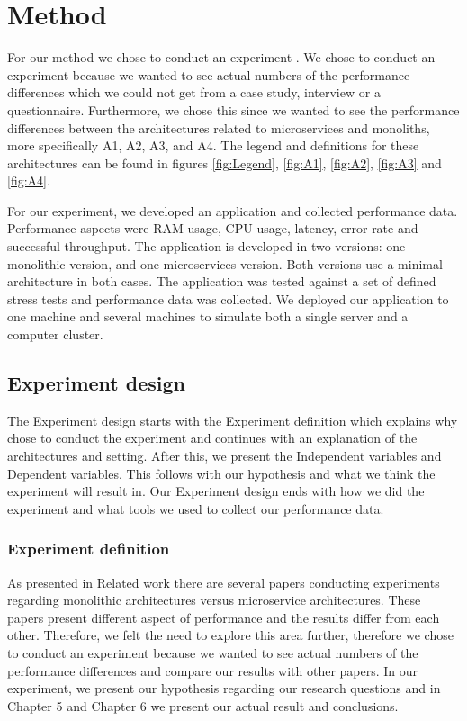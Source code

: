 \documentclass[a4paper,oneside]{bth}
\begin{document}
\chapter{Method} \label{Method}

For our method we chose to conduct an experiment \cite{Juristo:2010:BSE:1965114}. We chose to conduct an experiment because we wanted to see actual numbers of the performance differences which we could not get from a case study, interview or a questionnaire. Furthermore, we chose this since we wanted to see the performance differences between the architectures related to microservices and monoliths, more specifically A1, A2, A3, and A4. The legend and definitions for these architectures can be found in figures \ref{fig:Legend}, \ref{fig:A1}, \ref{fig:A2}, \ref{fig:A3} and \ref{fig:A4}.

\par\vspace {0.5cm}

For our experiment, we developed an application and collected performance data.  Performance aspects were RAM usage, CPU usage, latency, error rate and successful throughput. The application is developed in two versions: one monolithic version, and one microservices version. Both versions use a minimal architecture in both cases. The application was tested against a set of defined stress tests and performance data was collected. We deployed our application to one machine and several machines to simulate both a single server and a computer cluster.


\section{Experiment design} \label{experimentDesign}

The Experiment design starts with the Experiment definition which explains why chose to conduct the experiment and continues with an explanation of the architectures and setting. After this, we present the Independent variables and Dependent variables. This follows with our hypothesis and what we think the experiment will result in. Our Experiment design ends with how we did the experiment and what tools we used to collect our performance data.

\subsection{Experiment definition}

As presented in Related work there are several papers \cite{Villamizar, Amaral, Kalidindi} conducting experiments regarding monolithic architectures versus microservice architectures. These papers present different aspect of performance and the results differ from each other. Therefore, we felt the need to explore this area further, therefore we chose to conduct an experiment because we wanted to see actual numbers of the performance differences and compare our results with other papers. In our experiment, we present our hypothesis regarding our research questions and in Chapter 5 and Chapter 6 we present our actual result and conclusions.
\end{document}
